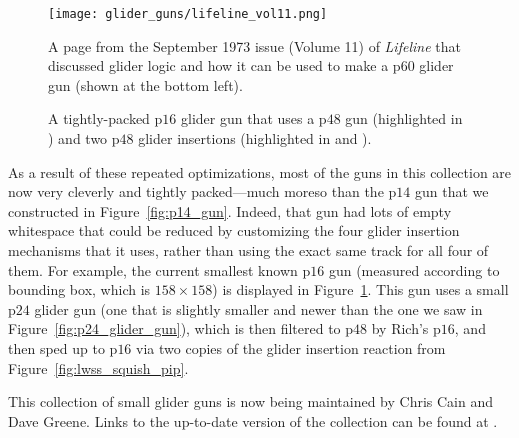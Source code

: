 \begin{figure}[!htb]
	\centering
	\begin{minipage}[b]{0.47\textwidth}
		\centering
		\texttt{[image: glider\_guns/lifeline\_vol11.png]}
		\caption{A page from the September 1973 issue (Volume 11) of \emph{Lifeline} that discussed glider logic and how it can be used to make a p$60$ glider gun (shown at the bottom left).}\label{fig:lifeline_v11}
	\end{minipage}\hfill
	\begin{minipage}[b]{0.49\textwidth}
		\centering
		\caption{A tightly-packed p$16$ glider gun that uses a p$48$ gun (highlighted in ) and two p$48$ glider insertions (highlighted in  and ).}\label{fig:p16_gun}
	\end{minipage}
\end{figure}

As a result of these repeated optimizations, most of the guns in this collection are now very cleverly and tightly packed---much moreso than the p$14$ gun that we constructed in Figure~\ref{fig:p14_gun}. Indeed, that gun had lots of empty whitespace that could be reduced by customizing the four glider insertion mechanisms that it uses, rather than using the exact same track for all four of them. For example, the current smallest known p$16$ gun (measured according to bounding box, which is $158 \times 158$) is displayed in Figure~\ref{fig:p16_gun}. This gun uses a small p$24$ glider gun (one that is slightly smaller and newer than the one we saw in Figure~\ref{fig:p24_glider_gun}), which is then filtered to p$48$ by Rich's p$16$, and then sped up to p$16$ via two copies of the glider insertion reaction from Figure~\ref{fig:lwss_squish_pip}.

This collection of small glider guns is now being maintained by Chris Cain and Dave Greene. Links to the up-to-date version of the collection can be found at .




